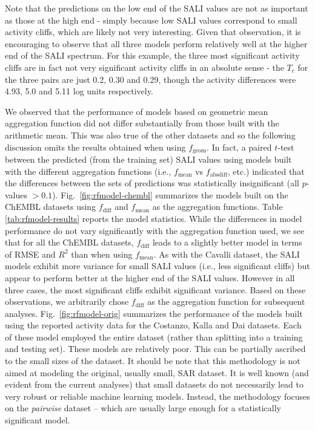 \documentclass[letterpaper, 12pt]{article}
\begin{document}
Note that the predictions on the low end of the SALI values are not as important as those at the
high end - simply because low SALI values correspond to small activity cliffs, which are likely not
very interesting. Given that observation, it is encouraging to observe that all three models perform
relatively well at the higher end of the SALI spectrum. For this example, the three most significant
activity cliffs are in fact not very significant activity cliffs in an absolute sense - the $T_c$
for the three pairs are just 0.2, 0.30 and 0.29, though the activity differences were 4.93, 5.0 and
5.11 log units respectively.

We observed that the performance of models based on geometric mean aggregation function did not
differ substantially from those built with the arithmetic mean. This was also true of the other
datasets and so the following discussion omits the results obtained when using
$f_{\textrm{geom}}$. In fact, a paired $t$-test between the predicted (from the training set) SALI
values using models built with the different aggregation functions (i.e., $f_{\textrm{mean}}$ vs
$f_{\textrm{absdiff}}$, etc.)  indicated that the differences between the sets of predictions was
statistically insignificant (all $p$-values $> 0.1$). Fig.~\ref{fig:rfmodel-chembl} summarizes the
models built on the ChEMBL datasets using $f_{\textrm{diff}}$ and $f_{\textrm{mean}}$ as the
aggregation functions. Table \ref{tab:rfmodel-results} reports the model statistics.  While the
differences in model performance do not vary significantly with the aggregation function used, we
see that for all the ChEMBL datasets, $f_{\textrm{diff}}$ leads to a slightly better model in terms
of RMSE and $R^2$ than when using $f_{\textrm{mean}}$. As with the Cavalli dataset, the SALI models
exhibit more variance for small SALI values (i.e., less significant cliffs) but appear to perform
better at the higher end of the SALI values. However in all three cases, the most significant cliffs
exhibit significant variance. Based on these observations, we arbitrarily chose $f_{\textrm{diff}}$
as the aggregation function for subsequent analyses. Fig.~\ref{fig:rfmodel-orig} summarizes the
performance of the models built using the reported activity data for the Costanzo, Kalla and Dai
datasets. Each of these model employed the entire dataset (rather than splitting into a training and
testing set). These models are relatively poor. This can be partially ascribed to the small sizes of
the dataset. It should be note that this methodology is not aimed at modeling the original, usually
small, SAR dataset. It is well known (and evident from the current analyses) that small datasets do
not necessarily lead to very robust or reliable machine learning models. Instead, the methodology
focuses on the \emph{pairwise} dataset -- which are usually large enough for a statistically
significant model.
\end{document}
